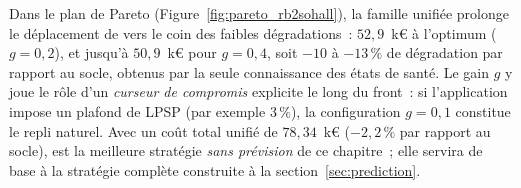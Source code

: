 Dans le plan de Pareto (Figure~\ref{fig:pareto_rb2sohall}), la famille unifiée prolonge le déplacement de \RBsohH{} vers le coin des faibles dégradations~: $52{,}9$~k€ à l'optimum ($g = 0{,}2$), et jusqu'à $50{,}9$~k€ pour $g = 0{,}4$, soit $-10$ à $-13\,\%$ de dégradation par rapport au socle, obtenus par la seule connaissance des états de santé. Le gain $g$ y joue le rôle d'un \emph{curseur de compromis} explicite le long du front~: si l'application impose un plafond de LPSP (par exemple $3\,\%$), la configuration $g = 0{,}1$ constitue le repli naturel. Avec un coût total unifié de $78{,}34$~k€ ($-2{,}2\,\%$ par rapport au socle), \RBsohA{} est la meilleure stratégie \emph{sans prévision} de ce chapitre~; elle servira de base à la stratégie complète construite à la section~\ref{sec:prediction}.
